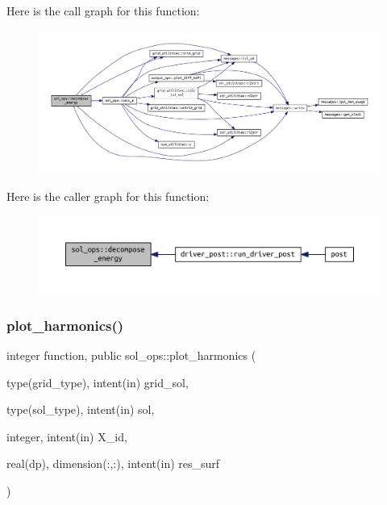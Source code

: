Here is the call graph for this function\+:
\nopagebreak
\begin{figure}[H]
\begin{center}
\leavevmode
\includegraphics[width=350pt]{namespacesol__ops_a5e15aa2fa915e7de74ce74f02cd35fac_cgraph}
\end{center}
\end{figure}
Here is the caller graph for this function\+:
\nopagebreak
\begin{figure}[H]
\begin{center}
\leavevmode
\includegraphics[width=350pt]{namespacesol__ops_a5e15aa2fa915e7de74ce74f02cd35fac_icgraph}
\end{center}
\end{figure}
\mbox{\label{namespacesol__ops_ab9a1e138cb94b547f4fd7669c677ed5c}} 
\subsubsection{\texorpdfstring{plot\+\_\+harmonics()}{plot\_harmonics()}}
{\footnotesize\ttfamily integer function, public sol\+\_\+ops\+::plot\+\_\+harmonics (\begin{DoxyParamCaption}\item[{type(grid\+\_\+type), intent(in)}]{grid\+\_\+sol,  }\item[{type(sol\+\_\+type), intent(in)}]{sol,  }\item[{integer, intent(in)}]{X\+\_\+id,  }\item[{real(dp), dimension(\+:,\+:), intent(in)}]{res\+\_\+surf }\end{DoxyParamCaption})}




